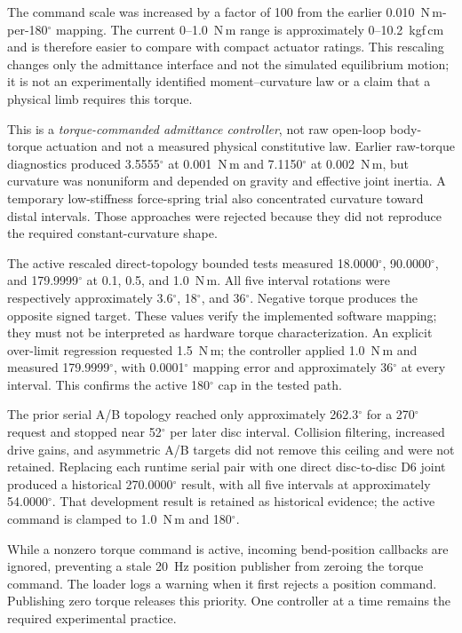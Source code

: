 \documentclass[11pt,letterpaper]{article}
\newcommand{\degrees}{\ensuremath{^{\circ}}}
\begin{document}
The command scale was increased by a factor of 100 from the earlier
0.010~N\,m-per-180\degrees{} mapping. The current 0--1.0~N\,m range is
approximately 0--10.2~kgf\,cm and is therefore easier to compare with compact
actuator ratings. This rescaling changes only the admittance interface and not
the simulated equilibrium motion; it is not an experimentally identified
moment--curvature law or a claim that a physical limb requires this torque.

This is a \emph{torque-commanded admittance controller}, not raw open-loop
body-torque actuation and not a measured physical constitutive law. Earlier
raw-torque diagnostics produced 3.5555\degrees{} at 0.001~N\,m and
7.1150\degrees{} at 0.002~N\,m, but curvature was nonuniform and depended on
gravity and effective joint inertia. A temporary low-stiffness force-spring
trial also concentrated curvature toward distal intervals. Those approaches
were rejected because they did not reproduce the required constant-curvature
shape.

The active rescaled direct-topology bounded tests measured 18.0000\degrees{},
90.0000\degrees{}, and 179.9999\degrees{} at 0.1, 0.5, and 1.0~N\,m. All five
interval rotations were respectively approximately 3.6\degrees{},
18\degrees{}, and 36\degrees{}.
Negative torque produces the opposite signed target. These values verify the
implemented software mapping; they must not be interpreted as hardware torque
characterization. An explicit over-limit regression requested 1.5~N\,m; the
controller applied 1.0~N\,m and measured 179.9999\degrees{}, with
0.0001\degrees{} mapping error and approximately 36\degrees{} at every
interval. This confirms the active 180\degrees{} cap in the tested path.

The prior serial A/B topology reached only approximately 262.3\degrees{} for a
270\degrees{} request and stopped near 52\degrees{} per later disc interval.
Collision filtering, increased drive gains, and asymmetric A/B targets did not
remove this ceiling and were not retained. Replacing each runtime serial pair
with one direct disc-to-disc D6 joint produced a historical 270.0000\degrees{}
result, with all five intervals at approximately 54.0000\degrees{}. That
development result is retained as historical evidence; the active command is
clamped to 1.0~N\,m and 180\degrees{}.

While a nonzero torque command is active, incoming bend-position callbacks are
ignored, preventing a stale 20~Hz position publisher from zeroing the torque
command. The loader logs a warning when it first rejects a position command.
Publishing zero torque releases this priority. One controller at a time remains
the required experimental practice.
\end{document}
